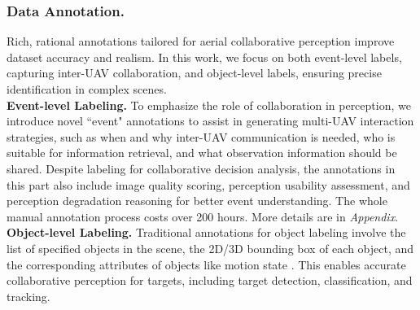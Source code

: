 \documentclass[letterpaper]{article} %
\begin{document}

\subsubsection{Data Annotation.}
Rich, rational annotations tailored for aerial collaborative perception improve dataset accuracy and realism. In this work, we focus on both event-level labels, capturing inter-UAV collaboration, and object-level labels, ensuring precise identification in complex scenes.
\\ \indent
\textbf{Event-level Labeling.} To emphasize the role of collaboration in perception, we introduce novel ``event" annotations to assist in generating multi-UAV 
interaction strategies,  
such as when and why inter-UAV communication is needed, who is suitable for information retrieval, and what observation information should be shared. Despite labeling for collaborative decision analysis, the annotations in this part also include image quality scoring, perception usability assessment, and perception degradation reasoning for better event understanding. The whole manual annotation process costs over 200 hours. More details are in \textit{Appendix}.
\\ \indent
\textbf{Object-level Labeling.} Traditional annotations for object labeling involve the list of specified objects in the scene, the 2D/3D bounding box of each object, and the corresponding attributes of objects like motion state \cite{hu2022where2comm}. This enables accurate collaborative perception for targets, including target detection, classification, and tracking.


\end{document}
